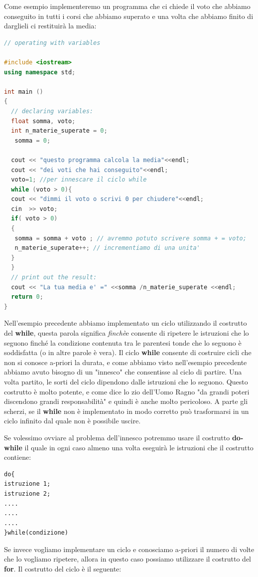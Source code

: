 \documentclass[11pt,fleqn]{book} %
\begin{document}
Come esempio implementeremo un programma che ci chiede il voto che abbiamo conseguito in tutti i corsi che abbiamo superato e una volta che abbiamo finito di darglieli ci restituirà la media:

\begin{lstlisting}[language=c++]
// operating with variables

#include <iostream>
using namespace std;

int main ()
{
  // declaring variables:
  float somma, voto;
  int n_materie_superate = 0;
   somma = 0;
  
  cout << "questo programma calcola la media"<<endl;
  cout << "dei voti che hai conseguito"<<endl;
  voto=1; //per innescare il ciclo while
  while (voto > 0){
  cout << "dimmi il voto o scrivi 0 per chiudere"<<endl;
  cin  >> voto;
  if( voto > 0)
  {
   somma = somma + voto ; // avremmo potuto scrivere somma + = voto;
   n_materie_superate++; // incrementiamo di una unita'
  }
  }
  // print out the result:
  cout << "La tua media e' =" <<somma /n_materie_superate <<endl;
  return 0; 
}
\end{lstlisting} 

Nell'esempio precedente abbiamo implementato un ciclo utilizzando il costrutto del \textbf{while}, questa parola significa \textit{finchè}e consente di ripetere le istruzioni che lo seguono finché la condizione contenuta tra le parentesi tonde che lo seguono è soddisfatta (o in altre parole è vera). Il ciclo \textbf{while} consente di costruire cicli che non si conosce a-priori la durata, e come abbiamo visto nell'esempio precedente abbiamo avuto bisogno di un "innesco" che consentisse al ciclo di partire. Una volta partito, le sorti del ciclo dipendono dalle istruzioni che lo seguono. Questo costrutto è molto potente, e come dice lo zio dell'Uomo Ragno "da grandi poteri discendono grandi responsabilità" e quindi è anche molto pericoloso. A parte gli scherzi, se il \textbf{while} non è implementato in modo corretto può trasformarsi in un ciclo infinito dal quale non è possibile uscire.

Se volessimo ovviare al problema dell'innesco potremmo usare il costrutto \textbf{do-while} il quale in ogni caso almeno una volta eseguirà le istruzioni che il costrutto contiene:

\begin{verbatim}
do{
istruzione 1;
istruzione 2;
....
....
....
}while(condizione)
\end{verbatim}

Se invece vogliamo implementare un ciclo e conosciamo a-priori il numero di volte che lo vogliamo ripetere, allora in questo caso possiamo utilizzare il costrutto del \textbf{for}. Il costrutto del ciclo è il seguente:
\end{document}
